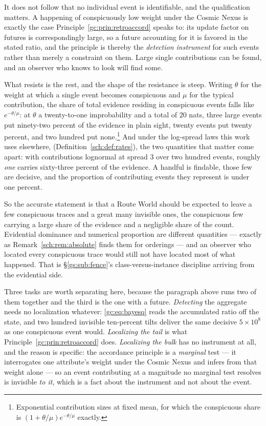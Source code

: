 \documentclass[11pt]{article}
\numberwithin{equation}{section}
\theoremstyle{plain}
\theoremstyle{definition}
\theoremstyle{remark}
\begin{document}
It does not follow that no individual event is identifiable, and the
qualification matters. A happening of conspicuously low weight under the
Cosmic Nexus is exactly the case
Principle~\ref{gc:prin:retroaccord} speaks to: its update factor on
futures is correspondingly large, so a future accounting for it is
favored in the stated ratio, and the principle is thereby the
\emph{detection instrument} for such events rather than merely a
constraint on them. Large single contributions can be found, and an
observer who knows to look will find some.

What resists is the rest, and the shape of the resistance is steep.
Writing $\theta$ for the weight at which a single event becomes
conspicuous and $\mu$ for the typical contribution, the share of total
evidence residing in conspicuous events falls like $e^{-\theta/\mu}$: at
$\theta$ a twenty-to-one improbability and a total of $20$ nats, three
large events put ninety-two percent of the evidence in plain sight,
twenty events put twenty percent, and two hundred put
none.\footnote{Exponential contribution sizes at fixed mean, for which
the conspicuous share is $(1+\theta/\mu)e^{-\theta/\mu}$ exactly.} And
under the log-spread laws this work uses elsewhere,
(Definition~\ref{sch:def:rates}), the two quantities that matter come
apart: with contributions lognormal at spread $3$ over two hundred
events, roughly \emph{one} carries sixty-three percent of the evidence.
A handful is findable, those few are decisive, and the proportion of
contributing events they represent is under one percent.

So the accurate statement is that a Route World should be expected to leave
a few conspicuous traces and a great many invisible ones, the conspicuous
few carrying a large share of the evidence and a negligible share of the
count. Evidential dominance and numerical proportion are different
quantities --- exactly as Remark~\ref{sch:rem:absolute} finds them for
orderings --- and an observer who located every conspicuous trace would
still not have located most of what happened. That is
\S\ref{gs:sub:fence}'s class-versus-instance discipline arriving from the
evidential side.

Three tasks are worth separating here, because the paragraph above runs
two of them together and the third is the one with a future.
\emph{Detecting} the aggregate needs no localization whatever:
\eqref{gc:eq:bayesq} reads the accumulated ratio off the state, and two
hundred invisible ten-percent tilts deliver the same decisive
$5\times10^{8}$ as one conspicuous event would. \emph{Localizing the
tail} is what Principle~\ref{gc:prin:retroaccord} does. \emph{Localizing
the bulk} has no instrument at all, and the reason is specific: the
accordance principle is a \emph{marginal} test --- it interrogates one
attribute's weight under the Cosmic Nexus and infers from that weight
alone --- so an event contributing at a magnitude no marginal test
resolves is invisible \emph{to it}, which is a fact about the instrument
and not about the event.
\end{document}
